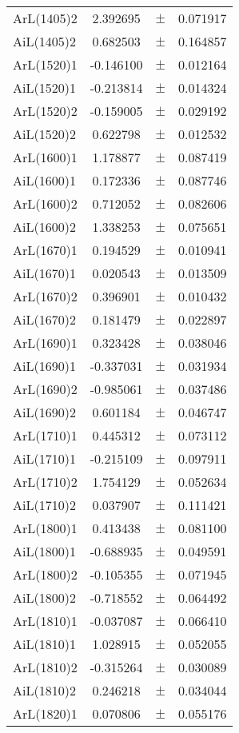 \begin{table}
\begin{tiny}
\begin{tabular}{lccc}
ArL(1405)2 & 2.392695 & $\pm$ & 0.071917 \\
AiL(1405)2 & 0.682503 & $\pm$ & 0.164857 \\
ArL(1520)1 & -0.146100 & $\pm$ & 0.012164 \\
AiL(1520)1 & -0.213814 & $\pm$ & 0.014324 \\
ArL(1520)2 & -0.159005 & $\pm$ & 0.029192 \\
AiL(1520)2 & 0.622798 & $\pm$ & 0.012532 \\
ArL(1600)1 & 1.178877 & $\pm$ & 0.087419 \\
AiL(1600)1 & 0.172336 & $\pm$ & 0.087746 \\
ArL(1600)2 & 0.712052 & $\pm$ & 0.082606 \\
AiL(1600)2 & 1.338253 & $\pm$ & 0.075651 \\
ArL(1670)1 & 0.194529 & $\pm$ & 0.010941 \\
AiL(1670)1 & 0.020543 & $\pm$ & 0.013509 \\
ArL(1670)2 & 0.396901 & $\pm$ & 0.010432 \\
AiL(1670)2 & 0.181479 & $\pm$ & 0.022897 \\
ArL(1690)1 & 0.323428 & $\pm$ & 0.038046 \\
AiL(1690)1 & -0.337031 & $\pm$ & 0.031934 \\
ArL(1690)2 & -0.985061 & $\pm$ & 0.037486 \\
AiL(1690)2 & 0.601184 & $\pm$ & 0.046747 \\
ArL(1710)1 & 0.445312 & $\pm$ & 0.073112 \\
AiL(1710)1 & -0.215109 & $\pm$ & 0.097911 \\
ArL(1710)2 & 1.754129 & $\pm$ & 0.052634 \\
AiL(1710)2 & 0.037907 & $\pm$ & 0.111421 \\
ArL(1800)1 & 0.413438 & $\pm$ & 0.081100 \\
AiL(1800)1 & -0.688935 & $\pm$ & 0.049591 \\
ArL(1800)2 & -0.105355 & $\pm$ & 0.071945 \\
AiL(1800)2 & -0.718552 & $\pm$ & 0.064492 \\
ArL(1810)1 & -0.037087 & $\pm$ & 0.066410 \\
AiL(1810)1 & 1.028915 & $\pm$ & 0.052055 \\
ArL(1810)2 & -0.315264 & $\pm$ & 0.030089 \\
AiL(1810)2 & 0.246218 & $\pm$ & 0.034044 \\
ArL(1820)1 & 0.070806 & $\pm$ & 0.055176 \\

\end{tabular}
\end{tiny}
\end{table}
